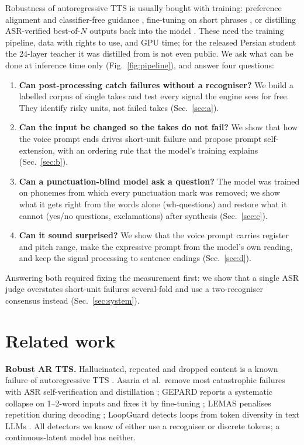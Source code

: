 \documentclass[conference]{IEEEtran}
\begin{document}
Robustness of autoregressive TTS is usually bought with training: preference alignment and classifier-free
guidance \cite{koel2025}, fine-tuning on short phrases \cite{gepard2026}, or distilling ASR-verified
best-of-$N$ outputs back into the model \cite{asaria2026}. These need the training pipeline, data with
rights to use, and GPU time; for the released Persian student the 24-layer teacher it was distilled from is
not even public. We ask what can be done at inference time only (Fig.~\ref{fig:pipeline}), and answer four questions:

\begin{enumerate}
\item \textbf{Can post-processing catch failures without a recogniser?} We build a labelled corpus of
single takes and test every signal the engine sees for free. They identify risky units, not failed takes
(Sec.~\ref{sec:a}).
\item \textbf{Can the input be changed so the takes do not fail?} We show that how the voice prompt ends
drives short-unit failure and propose prompt self-extension, with an ordering rule that the model's
training explains (Sec.~\ref{sec:b}).
\item \textbf{Can a punctuation-blind model ask a question?} The model was trained on phonemes from which
every punctuation mark was removed; we show what it gets right from the words alone (wh-questions) and
restore what it cannot (yes/no questions, exclamations) after synthesis (Sec.~\ref{sec:c}).
\item \textbf{Can it sound surprised?} We show that the voice prompt carries register and pitch range, make
the expressive prompt from the model's own reading, and keep the signal processing to sentence endings
(Sec.~\ref{sec:d}).
\end{enumerate}
Answering both required fixing the measurement first: we show that a single ASR judge overstates short-unit
failures several-fold and use a two-recogniser consensus instead (Sec.~\ref{sec:system}).

\section{Related work}
\textbf{Robust AR TTS.} Hallucinated, repeated and dropped content is a known failure of autoregressive
TTS \cite{koel2025,borodin2026repetition}. Asaria et al.\ remove most catastrophic failures with ASR
self-verification and distillation \cite{asaria2026}; GEPARD reports a systematic collapse on 1--2-word
inputs and fixes it by fine-tuning \cite{gepard2026}; LEMAS penalises repetition during decoding
\cite{lemas2026}; LoopGuard detects loops from token diversity in text LLMs \cite{loopguard2026}. All
detectors we know of either use a recogniser or discrete tokens; a continuous-latent model has neither.
\end{document}
